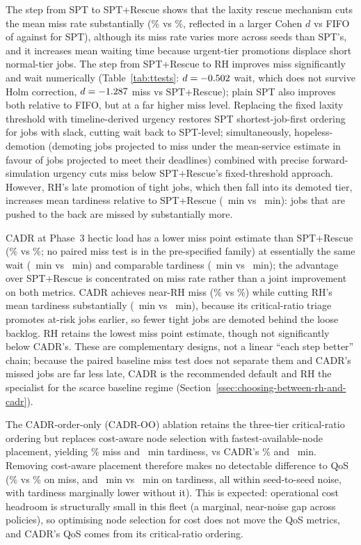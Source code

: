{The step from SPT to SPT+Rescue shows that the laxity rescue mechanism cuts the mean miss rate substantially (\RescueMiss\% vs \SPTmiss\%, reflected in a larger Cohen $d$ vs FIFO of \RescueFIFOmissD{} against \SPTFIFOmissD{} for SPT), although its miss rate varies more across seeds than SPT's, and it increases mean waiting time because urgent-tier promotions displace short normal-tier jobs. The step from SPT+Rescue to RH improves miss significantly and wait numerically (Table~\ref{tab:ttests}: $d=-0.502$ wait, which does not survive Holm correction, $d=-1.287$ miss vs SPT+Rescue); plain SPT also improves both relative to FIFO, but at a far higher miss level. Replacing the fixed laxity threshold with timeline-derived urgency restores SPT shortest-job-first ordering for jobs with slack, cutting wait back to SPT-level; simultaneously, hopeless-demotion (demoting jobs projected to miss under the mean-service estimate in favour of jobs projected to meet their deadlines) combined with precise forward-simulation urgency cuts miss below SPT+Rescue's fixed-threshold approach. However, RH's late promotion of tight jobs, which then fall into its demoted tier, increases mean tardiness relative to SPT+Rescue (\RHtard~min vs \RescueTard~min): jobs that are pushed to the back are missed by substantially more.

CADR at Phase~3 hectic load has a lower miss point estimate than SPT+Rescue (\CADRmiss\% vs \RescueMiss\%; no paired miss test is in the pre-specified family) at essentially the same wait (\CADRwait~min vs \RescueWait~min) and comparable tardiness (\CADRtard~min vs \RescueTard~min); the advantage over SPT+Rescue is concentrated on miss rate rather than a joint improvement on both metrics. CADR achieves near-RH miss (\CADRmiss\% vs \RHMiss\%) while cutting RH's mean tardiness substantially (\CADRtard~min vs \RHtard~min), because its critical-ratio triage promotes at-risk jobs earlier, so fewer tight jobs are demoted behind the loose backlog. RH retains the lowest miss point estimate, though not significantly below CADR's. These are complementary designs, not a linear ``each step better'' chain; because the paired baseline miss test does not separate them and CADR's missed jobs are far less late, CADR is the recommended default and RH the specialist for the scarce baseline regime (Section~\ref{ssec:choosing-between-rh-and-cadr}).

The CADR-order-only (CADR-OO) ablation retains the three-tier critical-ratio ordering but replaces cost-aware node selection with fastest-available-node placement, yielding \CADROOmiss\% miss and \CADROOtard~min tardiness, vs CADR's \CADRmiss\% and \CADRtard~min. Removing cost-aware placement therefore makes no detectable difference to QoS (\CADROOmiss\% vs \CADRmiss\% on miss, and \CADROOtard~min vs \CADRtard~min on tardiness, all within seed-to-seed noise, with tardiness marginally lower without it). This is expected: operational cost headroom is structurally small in this fleet (a marginal, near-noise gap across policies), so optimising node selection for cost does not move the QoS metrics, and CADR's QoS comes from its critical-ratio ordering.

}
